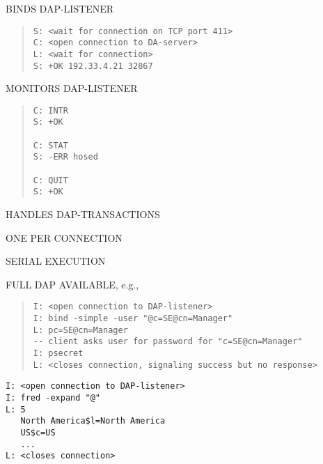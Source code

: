 \begin{bwslide}

\begin{nrtc}
\item	BINDS DAP-LISTENER
\begin{quote}\begin{verbatim}
S: <wait for connection on TCP port 411>
C: <open connection to DA-server>
L: <wait for connection>
S: +OK 192.33.4.21 32867
\end{verbatim}\end{quote}

\item	MONITORS DAP-LISTENER
\begin{quote}\begin{verbatim}
C: INTR
S: +OK

C: STAT
S: -ERR hosed

C: QUIT
S: +OK
\end{verbatim}\end{quote}
\end{nrtc}
\end{bwslide}


\begin{bwslide}

\begin{nrtc}
\item	HANDLES DAP-TRANSACTIONS
    \begin{nrtc}
    \item	ONE PER CONNECTION

    \item	SERIAL EXECUTION
    \end{nrtc}

\item	FULL DAP AVAILABLE, e.g.,
\begin{quote}\begin{verbatim}
I: <open connection to DAP-listener>
I: bind -simple -user "@c=SE@cn=Manager"
L: pc=SE@cn=Manager
-- client asks user for password for "c=SE@cn=Manager"
I: psecret
L: <closes connection, signaling success but no response>
\end{verbatim}\end{quote}
\end{nrtc}
\end{bwslide}


\begin{bwslide}

\begin{verbatim}
I: <open connection to DAP-listener>
I: fred -expand "@"
L: 5
   North America$l=North America
   US$c=US
   ...
L: <closes connection>
\end{verbatim}
\end{bwslide}


